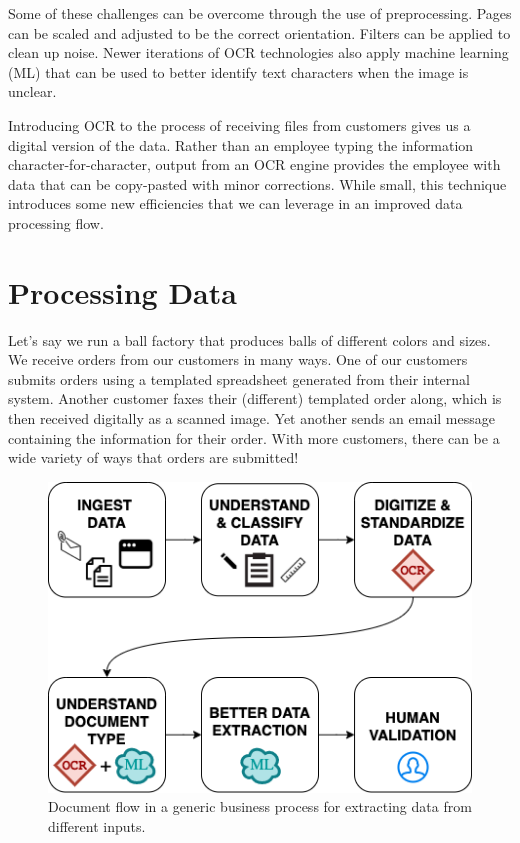 \documentclass[conference]{IEEEtran}
\begin{document}
Some of these challenges can be overcome through the use of preprocessing. Pages can be scaled and adjusted to be the correct orientation. Filters can be applied to clean up noise. Newer iterations of OCR technologies also apply machine learning (ML) that can be used to better identify text characters when the image is unclear.

Introducing OCR to the process of receiving files from customers gives us a digital version of the data. Rather than an employee typing the information character-for-character, output from an OCR engine provides the employee with data that can be copy-pasted with minor corrections. While small, this technique introduces some new efficiencies that we can leverage in an improved data processing flow.

\section{Processing Data} \label{sectionProcessingData}

Let's say we run a ball factory that produces balls of different colors and sizes. We receive orders from our customers in many ways. One of our customers submits orders using a templated spreadsheet generated from their internal system. Another customer faxes their (different) templated order along, which is then received digitally as a scanned image. Yet another sends an email message containing the information for their order. With more customers, there can be a wide variety of ways that orders are submitted!

\begin{figure}[ht]
\centerline{\includegraphics[width=\columnwidth]{HighLevelFlow.png}}
\caption{Document flow in a generic business process for extracting data from different inputs.}
\label{figHighLevelFlow}
\end{figure}
\end{document}
